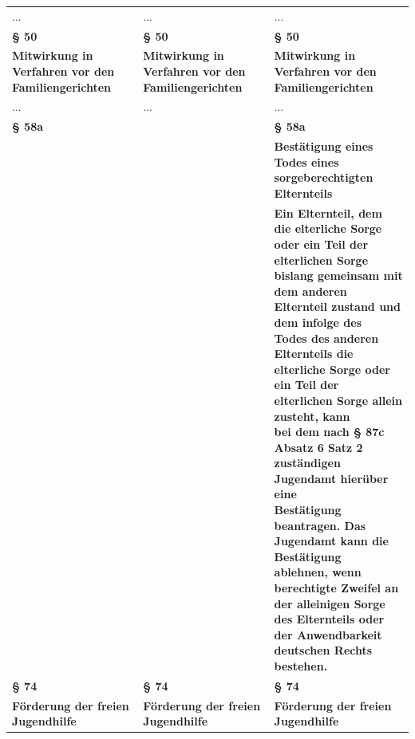 \documentclass[10pt,a4paper,landscape]{article}
\begin{document}
\begin{longtable}{|L{8.2cm}|L{8.2cm}|L{8.2cm}|}
\hhline{|---|}
... & ... & ... \\
\hhline{|---|}
\textbf{\S{} 50} & \textbf{\S{} 50} & \textbf{\S{} 50} \\
\hhline{|---|}
\textbf{Mitwirkung in Verfahren vor den  \newline Familiengerichten} & \textbf{Mitwirkung in Verfahren vor den  \newline Familiengerichten} & \textbf{Mitwirkung in Verfahren vor den  \newline Familiengerichten} \\
\hhline{|---|}
... & ... & ... \\
\hhline{|---|}
\textbf{\S{} 58a} &  & \textbf{\S{} 58a } \\
\hhline{|---|}
 &  & \textbf{\textcolor{diffgreen}{Bestätigung eines Todes eines  \newline sorgeberechtigten Elternteils}} \\
\hhline{|---|}
 &  & \textbf{\textcolor{diffgreen}{Ein Elternteil, dem die elterliche Sorge  \newline oder ein Teil der elterlichen Sorge  \newline bislang gemeinsam mit dem anderen  \newline Elternteil zustand und dem infolge des  \newline Todes des anderen Elternteils die  \newline elterliche Sorge oder ein Teil der  \newline elterlichen Sorge allein zusteht, kann  \newline bei dem nach \S{} 87c Absatz 6 Satz 2  \newline zuständigen Jugendamt hierüber eine  \newline Bestätigung beantragen. Das  \newline Jugendamt kann die Bestätigung  \newline ablehnen, wenn berechtigte Zweifel an  \newline der alleinigen Sorge des Elternteils oder  \newline der Anwendbarkeit deutschen Rechts  \newline bestehen.}} \\
\hhline{|---|}
\textbf{\S{} 74} & \textbf{\S{} 74} & \textbf{\S{} 74} \\
\hhline{|---|}
\textbf{Förderung der freien Jugendhilfe} & \textbf{Förderung der freien Jugendhilfe} & \textbf{Förderung der freien Jugendhilfe} \\

\end{longtable}
\end{document}
